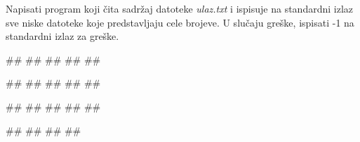 \begin{Exercise}[label=A_o_2_3] 
Napisati program koji čita sadržaj datoteke \textit{ulaz.txt} i ispisuje na standardni izlaz sve niske datoteke koje predstavljaju cele brojeve. U slučaju greške, ispisati -1 na standardni izlaz za greške. 

\begin{minitest}
\begin{test}{1}

##
##
##
#\naslovIzlaz#
##
\end{test}
\end{minitest}
\begin{minitest}
\begin{test}{2}

##
##
##
#\naslovIzlaz#
##
\end{test}
\end{minitest}
\begin{minitest}
\begin{test}{3}

##
##
##
#\naslovIzlaz#
#\izlaz{}#
\end{test}
\end{minitest}

\begin{minitest}
\begin{test}{4}

##
##
#\naslovIzlazZaGresku#
##
\end{test}
\end{minitest}

\end{Exercise}

\ifresenja
\begin{Answer}[ref=A_o_2_3]
\sstrana
\end{Answer}
\fi


